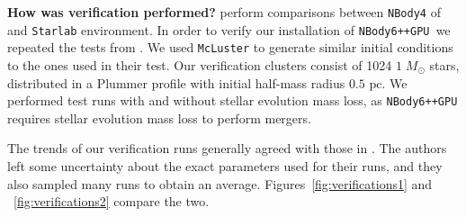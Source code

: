 \documentclass[preprint1]{aastex}
\newcommand\Msun{\; M_\odot}
\newcommand\pc{\mbox{ pc}}
\newcommand\nbody{\texttt{NBody6++GPU }}
\numberwithin{equation}{section}
\begin{document}
\textbf{How was verification performed?}
\citet{2009Anders, 2012Anders} perform comparisons between \texttt{NBody4} of \citet{1999Aarseth} and \texttt{Starlab} environment.  In order to verify our installation of \nbody we repeated the tests from \citet{2009Anders}.  We used \texttt{McLuster} to generate similar initial conditions to the ones used in their test. Our verification clusters consist of 1024 $1 \Msun$ stars, distributed in a Plummer profile with initial half-mass radius $0.5 \pc$.  We performed test runs with and without stellar evolution mass loss, as \nbody requires stellar evolution mass loss to perform mergers.

The trends of our verification runs generally agreed with those in \citet{2009Anders}.  The authors left some uncertainty about the exact parameters used for their runs, and they also sampled many runs to obtain an average. Figures~\ref{fig:verifications1} and ~\ref{fig:verifications2} compare the two.
\end{document}
